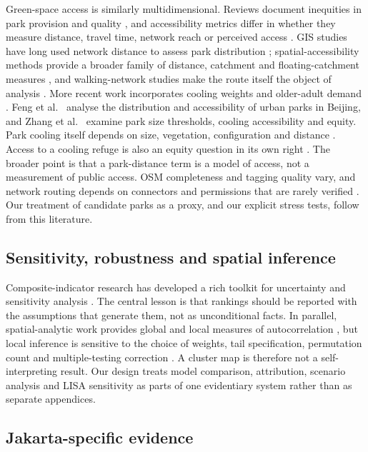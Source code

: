\documentclass[times,twoside]{_Templates/MultiTargetManuscript}
\begin{document}
Green-space access is similarly multidimensional. Reviews document inequities
in park provision and quality \citep{wolch2014,rigolon2016}, and accessibility
metrics differ in whether they measure distance, travel time, network reach or
perceived access \citep{ekkel2017}. GIS studies have long used network distance
to assess park distribution \citep{oh2007}; spatial-accessibility methods provide
a broader family of distance, catchment and floating-catchment measures
\citep{luo2003,luo2009}, and walking-network studies make the route itself the
object of analysis \citep{stoia2022}. More recent work incorporates cooling
weights and older-adult demand \citep{kim2026}. Feng et al.\
\citep{feng2019} analyse the distribution and accessibility of urban parks in
Beijing, and Zhang et al.\ \citep{zhang2024} examine park size thresholds,
cooling accessibility and equity. Park cooling itself depends on size,
vegetation, configuration and distance \citep{bowler2010,aram2019,masoudi2019,algretawee2022}.
Access to a cooling refuge is also an equity question in its own right
\citep{voelkel2018,amorim2023}. The broader point is that a
park-distance term is a model of access, not a measurement of public access.
OSM completeness and tagging quality vary, and network routing depends on
connectors and permissions that are rarely verified \citep{haklay2010,barron2014,herfort2023}.
Our treatment of candidate parks as a proxy, and our explicit stress tests, follow
from this literature.

\subsection{Sensitivity, robustness and spatial inference}

Composite-indicator research has developed a rich toolkit for uncertainty and
sensitivity analysis \citep{saisana2005,paruolo2013,greco2019}. The central
lesson is that rankings should be reported with the assumptions that generate
them, not as unconditional facts. In parallel, spatial-analytic work provides
global and local measures of autocorrelation \citep{anselin1995,getis1992}, but
local inference is sensitive to the choice of weights, tail specification,
permutation count and multiple-testing correction
\citep{benjamini1995,benjamini2001}. A cluster map is therefore not a
self-interpreting result. Our design treats model comparison, attribution,
scenario analysis and LISA sensitivity as parts of one evidentiary system rather
than as separate appendices.

\subsection{Jakarta-specific evidence}
\end{document}
